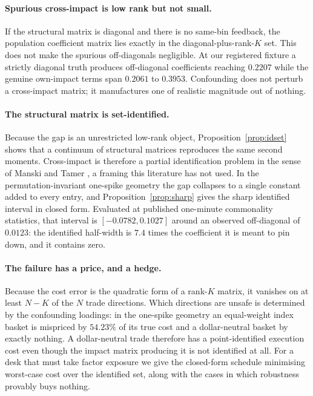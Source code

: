 \documentclass[10pt,twocolumn]{article}
\theoremstyle{remark}
\begin{document}
\paragraph{Spurious cross-impact is low rank but not small.}
If the structural matrix is diagonal and there is no same-bin feedback, the
population coefficient matrix lies exactly in the diagonal-plus-rank-$K$ set.
This does not make the spurious off-diagonals negligible. At our registered
fixture a strictly diagonal truth produces off-diagonal coefficients reaching
$0.2207$ while the genuine own-impact terms span $0.2061$ to $0.3953$.
Confounding does not perturb a cross-impact matrix; it manufactures one of
realistic magnitude out of nothing.

\paragraph{The structural matrix is set-identified.}
Because the gap is an unrestricted low-rank object,
Proposition~\ref{prop:idset} shows that a continuum of structural matrices
reproduces the same second moments. Cross-impact is therefore a partial
identification problem in the sense of Manski and Tamer
\cite{Manski2003,ManskiTamer2002,Tamer2010}, a framing this literature has not
used. In the permutation-invariant one-spike geometry the gap collapses to a
single constant added to every entry, and Proposition~\ref{prop:sharp} gives
the sharp identified interval in closed form. Evaluated at published
one-minute commonality statistics, that interval is $[-0.0782, 0.1027]$ around
an observed off-diagonal of $0.0123$: the identified half-width is $7.4$ times
the coefficient it is meant to pin down, and it contains zero.

\paragraph{The failure has a price, and a hedge.}
Because the cost error is the quadratic form of a rank-$K$ matrix, it vanishes
on at least $N-K$ of the $N$ trade directions. Which directions are unsafe is
determined by the confounding loadings: in the one-spike geometry an
equal-weight index basket is mispriced by $54.23\%$ of its true cost and a
dollar-neutral basket by exactly nothing. A dollar-neutral trade therefore has
a point-identified execution cost even though the impact matrix producing it is
not identified at all. For a desk that must take factor exposure we give the
closed-form schedule minimising worst-case cost over the identified set, along
with the cases in which robustness provably buys nothing.
\end{document}
